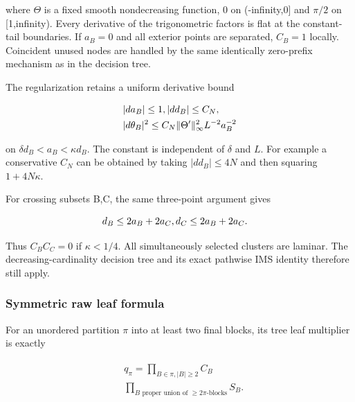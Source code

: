 where \(\Theta\) is a fixed smooth nondecreasing function, \(0\) on
(-infinity,0{]} and \(\pi /2\) on {[}1,infinity). Every derivative of
the trigonometric factors is flat at the constant-tail boundaries. If
\(a_{B}=0\) and all exterior points are separated, \(C_{B}=1\) locally.
Coincident unused nodes are handled by the same identically zero-prefix
mechanism as in the decision tree.

The regularization retains a uniform derivative bound

\begin{gather*}
\begin{aligned}
& \vert d a_{B}\vert \le 1, \vert d d_{B}\vert \le C_{N}, \\
& \vert d \theta _{B}\vert ^{2} \le  C_{N} \Vert \Theta '\Vert _{\infty}^{2} L^{-2} a_{B}^{-2}
\end{aligned}\notag
\end{gather*}

on \(\delta  d_{B}<a_{B}<\kappa  d_{B}\). The constant is independent of
\(\delta\) and \(L\). For example a conservative \(C_{N}\) can be
obtained by taking \(\vert d d_{B}\vert \le 4N\) and then squaring
\(1+4N \kappa\).

For crossing subsets B,C, the same three-point argument gives

\begin{gather*}
\begin{aligned}
& d_{B} \le  2a_{B}+2a_{C}, d_{C} \le  2a_{B}+2a_{C}.
\end{aligned}\notag
\end{gather*}

Thus \(C_{B} C_{C}=0\) if \(\kappa <1/4\). All simultaneously selected
clusters are laminar. The decreasing-cardinality decision tree and its
exact pathwise IMS identity therefore still apply.

\subsubsection{Symmetric raw leaf
formula}\label{j-symmetric-raw-leaf-formula}

For an unordered partition \(\pi\) into at least two final blocks, its
tree leaf multiplier is exactly

\begin{gather*}
\begin{aligned}
& q_{\pi} = \prod _{B \in  \pi , \vert B\vert \ge 2} C_{B} \\
& \prod _{B \text{ proper union of } \ge 2 \pi\text{-blocks}} S_{B}.
\end{aligned}\tag{1}
\end{gather*}

